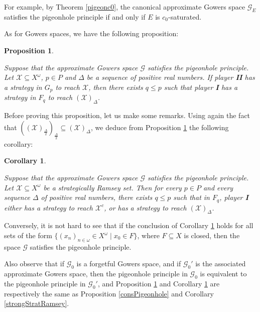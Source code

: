 \documentclass[a4paper,11pt]{article}
\newtheorem{cor}[thm]{Corollary}
\newtheorem{prop}[thm]{Proposition}
\theoremstyle{definition}
\numberwithin{equation}{section}
\newcommand{\X}{\mathcal{X}}
\newcommand{\G}{\mathcal{G}}
\newcommand{\I}{\textbf{I}}
\newcommand{\II}{\textbf{II}}
\begin{document}
For example, by Theorem \ref{pigeonc0}, the canonical approximate Gowers space $\G_E$ satisfies the pigeonhole principle if and only if $E$ is $c_0$-saturated.

\smallskip

As for Gowers spaces, we have the following proposition:

\begin{prop}\label{ApproxConsPigeonhole}

Suppose that the approximate Gowers space $\G$ satisfies the pigeonhole principle. Let $\X \subseteq X^\omega$, $p \in P$ and $\Delta$ be a sequence of positive real numbers. If player \II{} has a strategy in $G_p$ to reach $\X$, then there exists $q \leqslant p$ such that player \I{} has a strategy in $F_q$ to reach $(\X)_\Delta$.

\end{prop}

Before proving this proposition, let us make some remarks. Using again the fact that $\left((\X)_\frac{\Delta}{2}\right)_\frac{\Delta}{2} \subseteq (\X)_\Delta$, we deduce from Proposition \ref{ApproxConsPigeonhole} the following corollary:

\begin{cor}\label{cor39}

Suppose that the approximate Gowers space $\G$ satisfies the pigeonhole principle. Let $\X \subseteq X^\omega$ be a strategically Ramsey set. Then for every $p \in P$ and every sequence $\Delta$ of positive real numbers, there exists $q \leqslant p$ such that in $F_q$, player \I{} either has a strategy to reach $\X^c$, or has a strategy to reach $(\X)_\Delta$.

\end{cor}

Conversely, it is not hard to see that if the conclusion of Corollary \ref{cor39} holds for all sets of the form $\{(x_n)_{n \in \omega} \in X^\omega \mid x_0 \in F\}$, where $F \subseteq X$ is closed, then the space $\G$ satisfies the pigeonhole principle.

\smallskip

Also observe that if $\G_0$ is a forgetful Gowers space, and if $\G_0'$ is the associated approximate Gowers space, then the pigeonhole principle in $\G_0$ is equivalent to the pigeonhole principle in $\G_0'$, and Proposition \ref{ApproxConsPigeonhole} and Corollary \ref{cor39} are respectively the same as Proposition \ref{consPigeonhole} and Corollary \ref{strongStratRamsey}.

\smallskip
\end{document}
